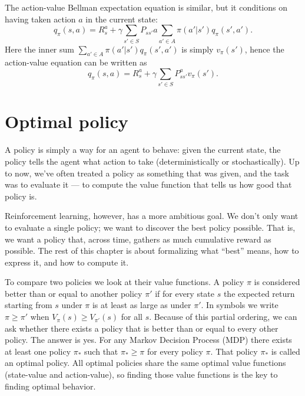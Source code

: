 The action-value Bellman expectation equation is similar, but it conditions on having taken action $a$ in the current state:
\begin{equation*}
    q_\pi(s,a)=R_s^a+\gamma\sum_{s'\in S}P_{ss'}a\sum_{a'\in A}\pi(a'|s')q_\pi(s',a').    
\end{equation*}
Here the inner sum $\sum_{a'\in A}\pi(a'|s')q_\pi(s',a')$ is simply $v_\pi(s')$, hence the action-value equation can be written as
\begin{equation*}
    q_\pi(s,a)=R_s^a+\gamma\sum_{s'\in S}P_{ss'}^av_\pi(s').
\end{equation*}

\section{Optimal policy}
A policy is simply a way for an agent to behave: given the current state, the policy tells the agent what action to take (deterministically or stochastically). Up to now, we’ve often treated a policy as something that was given, and the task was to evaluate it — to compute the value function that tells us how good that policy is.

Reinforcement learning, however, has a more ambitious goal. We don’t only want to evaluate a single policy; we want to discover the best policy possible. That is, we want a policy that, across time, gathers as much cumulative reward as possible. The rest of this chapter is about formalizing what “best” means, how to express it, and how to compute it.

To compare two policies we look at their value functions. A policy $\pi$ is considered better than or equal to another policy $\pi'$ if for every state $s$ the expected return starting from $s$ under $\pi$ is at least as large as under $\pi'$. In symbols we write $\pi \geq \pi'$ when $V_\pi(s) \geq V_{\pi'}(s)$ for all $s$.
Because of this partial ordering, we can ask whether there exists a policy that is better than or equal to every other policy. The answer is yes. For any Markov Decision Process (MDP) there exists at least one policy $\pi_*$ such that $\pi_* \geq \pi$ for every policy $\pi$. That policy $\pi_*$ is called an optimal policy.
All optimal policies share the same optimal value functions (state-value and action-value), so finding those value functions is the key to finding optimal behavior.

